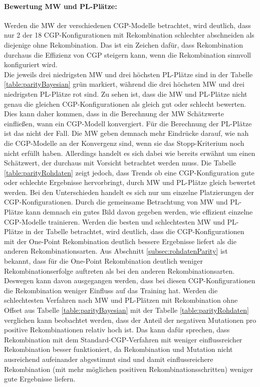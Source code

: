 \paragraph{Bewertung MW und PL-Plätze:}
Werden die MW der verschiedenen CGP-Modelle betrachtet, wird deutlich, dass nur 2 der 18 CGP-Konfigurationen mit Rekombination schlechter abschneiden als diejenige ohne Rekombination.
Das ist ein Zeichen dafür, dass Rekombination durchaus die Effizienz von CGP steigern kann, wenn die Rekombination sinnvoll konfiguriert wird.\\
Die jeweils drei niedrigsten MW und drei höchsten PL-Plätze sind in der Tabelle \ref{table:parityBayesian} grün markiert, während die drei höchsten MW und drei niedrigsten PL-Plätze rot sind.
Zu sehen ist, dass die MW und PL-Plätze nicht genau die gleichen CGP-Konfigurationen als gleich gut oder schlecht bewerten.
Dies kann daher kommen, dass in die Berechnung der MW Schätzwerte einfließen, wann ein CGP-Modell konvergiert.
Für die Berechnung der PL-Plätze ist das nicht der Fall.
Die MW geben demnach mehr Eindrücke darauf, wie nah die CGP-Modelle an der Konvergenz sind, wenn sie das Stopp-Kriterium noch nicht erfüllt haben.
Allerdings handelt es sich dabei wie bereits erwähnt um einen Schätzwert, der durchaus mit Vorsicht betrachtet werden muss.
Die Tabelle \ref{table:parityRohdaten} zeigt jedoch, dass Trends ob eine CGP-Konfiguration gute oder schlechte Ergebnisse hervorbringt, durch MW und PL-Plätze gleich bewertet werden.
Bei den Unterschieden handelt es sich nur um einzelne Platzierungen der CGP-Konfigurationen.
Durch die gemeinsame Betrachtung von MW und PL-Plätze kann demnach ein gutes Bild davon gegeben werden, wie effizient einzelne CGP-Modelle trainieren.
Werden die besten und schlechtesten MW und PL-Plätze in der Tabelle betrachtet, wird deutlich, dass die CGP-Konfigurationen mit der One-Point Rekombination deutlich bessere Ergebnisse liefert als die anderen Rekombinationsarten.
Aus Abschnitt \ref{subsec:rohdatenParity} ist bekannt, dass für die One-Point Rekombination deutlich weniger Rekombinationserfolge auftreten als bei den anderen Rekombinationsarten.
Deswegen kann davon ausgegangen werden, dass bei diesen CGP-Konfigurationen die Rekombination weniger Einfluss auf das Training hat.
Werden die schlechtesten Verfahren nach MW und PL-Plätzen mit Rekombination ohne Offset aus Tabelle \ref{table:parityBayesian} mit der Tabelle \ref{table:parityRohdaten} verglichen kann beobachtet werden, dass der Anteil der negativen Mutationen pro positive Rekombinationen relativ hoch ist.
Das kann dafür sprechen, dass Rekombination mit dem Standard-CGP-Verfahren mit weniger einflussreicher Rekombination besser funktioniert, da Rekombination und Mutation nicht ausreichend aufeinander abgestimmt sind und damit einflussreichere Rekombination (mit mehr möglichen positiven Rekombinationsschritten) weniger gute Ergebnisse liefern.

